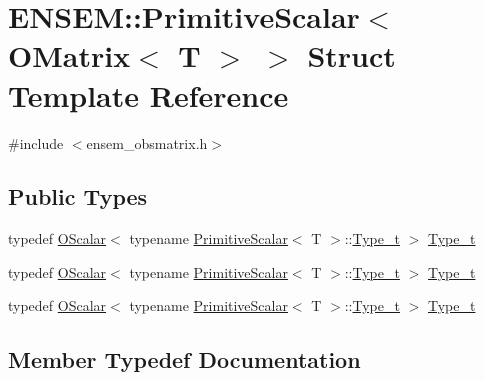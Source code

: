 \hypertarget{structENSEM_1_1PrimitiveScalar_3_01OMatrix_3_01T_01_4_01_4}{}\section{E\+N\+S\+EM\+:\+:Primitive\+Scalar$<$ O\+Matrix$<$ T $>$ $>$ Struct Template Reference}
\label{structENSEM_1_1PrimitiveScalar_3_01OMatrix_3_01T_01_4_01_4}


{\ttfamily \#include $<$ensem\+\_\+obsmatrix.\+h$>$}

\subsection*{Public Types}
\begin{DoxyCompactItemize}
\item 
typedef \mbox{\hyperlink{classENSEM_1_1OScalar}{O\+Scalar}}$<$ typename \mbox{\hyperlink{structENSEM_1_1PrimitiveScalar}{Primitive\+Scalar}}$<$ T $>$\+::\mbox{\hyperlink{structENSEM_1_1PrimitiveScalar_3_01OMatrix_3_01T_01_4_01_4_a4e7f325878a1ec4acea1a745cbd24af6}{Type\+\_\+t}} $>$ \mbox{\hyperlink{structENSEM_1_1PrimitiveScalar_3_01OMatrix_3_01T_01_4_01_4_a4e7f325878a1ec4acea1a745cbd24af6}{Type\+\_\+t}}
\item 
typedef \mbox{\hyperlink{classENSEM_1_1OScalar}{O\+Scalar}}$<$ typename \mbox{\hyperlink{structENSEM_1_1PrimitiveScalar}{Primitive\+Scalar}}$<$ T $>$\+::\mbox{\hyperlink{structENSEM_1_1PrimitiveScalar_3_01OMatrix_3_01T_01_4_01_4_a4e7f325878a1ec4acea1a745cbd24af6}{Type\+\_\+t}} $>$ \mbox{\hyperlink{structENSEM_1_1PrimitiveScalar_3_01OMatrix_3_01T_01_4_01_4_a4e7f325878a1ec4acea1a745cbd24af6}{Type\+\_\+t}}
\item 
typedef \mbox{\hyperlink{classENSEM_1_1OScalar}{O\+Scalar}}$<$ typename \mbox{\hyperlink{structENSEM_1_1PrimitiveScalar}{Primitive\+Scalar}}$<$ T $>$\+::\mbox{\hyperlink{structENSEM_1_1PrimitiveScalar_3_01OMatrix_3_01T_01_4_01_4_a4e7f325878a1ec4acea1a745cbd24af6}{Type\+\_\+t}} $>$ \mbox{\hyperlink{structENSEM_1_1PrimitiveScalar_3_01OMatrix_3_01T_01_4_01_4_a4e7f325878a1ec4acea1a745cbd24af6}{Type\+\_\+t}}
\end{DoxyCompactItemize}


\subsection{Member Typedef Documentation}
\mbox{\label{structENSEM_1_1PrimitiveScalar_3_01OMatrix_3_01T_01_4_01_4_a4e7f325878a1ec4acea1a745cbd24af6}} 
